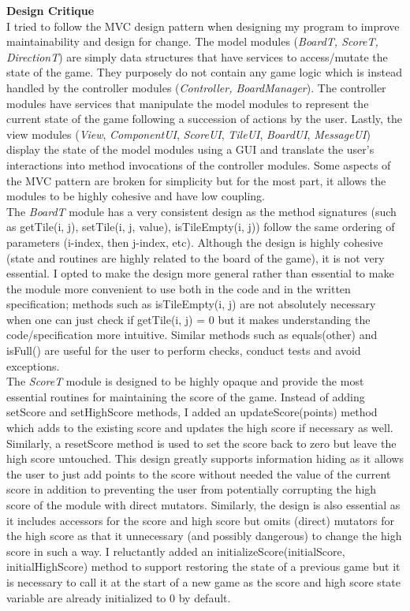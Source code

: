 \documentclass[12pt]{article}
\begin{document}
\textbf{Design Critique} \\

I tried to follow the MVC design pattern when designing my program to improve maintainability and design for change. The model modules (\textit{BoardT, ScoreT, DirectionT}) are simply data structures that have services to access/mutate the state of the game. They purposely do not contain any game logic which is instead handled by the controller modules (\textit{Controller, BoardManager}). The controller modules have services that manipulate the model modules to represent the current state of the game following a succession of actions by the user. Lastly, the view modules (\textit{View}, \textit{ComponentUI}, \textit{ScoreUI}, \textit{TileUI}, \textit{BoardUI}, \textit{MessageUI}) display the state of the model modules using a GUI and translate the user's interactions into method invocations of the controller modules. Some aspects of the MVC pattern are broken for simplicity but for the most part, it allows the modules to be highly cohesive and have low coupling. \\

The \textit{BoardT} module has a very consistent design as the method signatures (such as getTile(i, j), setTile(i, j, value), isTileEmpty(i, j)) follow the same ordering of parameters (i-index, then j-index, etc). Although the design is highly cohesive (state and routines are highly related to the board of the game), it is not very essential. I opted to make the design more general rather than essential to make the module more convenient to use both in the code and in the written specification; methods such as isTileEmpty(i, j) are not absolutely necessary when one can just check if getTile(i, j) = 0 but it makes understanding the code/specification more intuitive. Similar methods such as equals(other) and isFull() are useful for the user to perform checks, conduct tests and avoid exceptions. \\

The \textit{ScoreT} module is designed to be highly opaque and provide the most essential routines for maintaining the score of the game. Instead of adding setScore and setHighScore methods, I added an updateScore(points) method which adds to the existing score and updates the high score if necessary as well. Similarly, a resetScore method is used to set the score back to zero but leave the high score untouched. This design greatly supports information hiding as it allows the user to just add points to the score without needed the value of the current score in addition to preventing the user from potentially corrupting the high score of the module with direct mutators. Similarly, the design is also essential as it includes accessors for the score and high score but omits (direct) mutators for the high score as that it unnecessary (and possibly dangerous) to change the high score in such a way. I reluctantly added an initializeScore(initialScore, initialHighScore) method to support restoring the state of a previous game but it is necessary to call it at the start of a new game as the score and high score state variable are already initialized to 0 by default. \\ 
\end{document}
